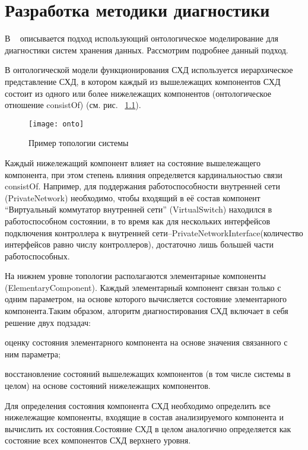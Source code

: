 

\begingroup
\renewcommand{\cleardoublepage}{}
\renewcommand{\clearpage}{}
\vspace{1em}
\chapter{Разработка методики диагностики}
\endgroup
В ~\cite{ontoapproach} описывается подход использующий онтологическое моделирование для диагностики систем хранения данных. Рассмотрим подробнее данный подход. 

В  онтологической  модели  функционирования СХД используется иерархическое представление СХД, в котором каждый из вышележащих компонентов СХД состоит из одного или более нижележащих компонентов (онтологическое отношение consistOf) (см. рис. ~\ref{fig:onto}).
\begin{figure}[h]
	\centering
	\texttt{[image: onto]}
	\caption{Пример топологии системы}
	\label{fig:onto}
\end{figure}

Каждый нижележащий компонент влияет на  состояние  вышележащего  компонента,  при  этом  степень  влияния определяется кардинальностью связи consistOf. Например, для поддержания работоспособности внутренней сети (PrivateNetwork) необходимо,  чтобы входящий  в  её  состав  компонент “Виртуальный коммутатор  внутренней  сети”  (VirtualSwitch)  находился  в  работоспособном состоянии,  в  то  время  как  для  нескольких  интерфейсов  подключения контроллера  к  внутренней  сети–PrivateNetworkInterface(количество интерфейсов  равно  числу  контроллеров),  достаточно  лишь  большей  части работоспособных.

На нижнем  уровне  топологии  располагаются  элементарные компоненты  (ElementaryComponent).  Каждый  элементарный  компонент связан  только  с  одним  параметром,  на  основе  которого вычисляется состояние элементарного компонента.Таким  образом,  алгоритм  диагностирования СХД включает  в  себя решение двух подзадач:
\begin{itemize*}
	\item{оценку состояния  элементарного  компонента  на  основе  значения связанного с ним параметра;}
	\item{восстановление состояний вышележащих компонентов (в том числе системы в целом) на основе состояний нижележащих компонентов.}
\end{itemize*}
Для определения состояния компонента СХД необходимо определить все  нижележащие  компоненты,  входящие  в  состав  анализируемого компонента и вычислить их состояния.Состояние СХД в целом аналогично определяется как состояние всех компонентов СХД верхнего уровня.

